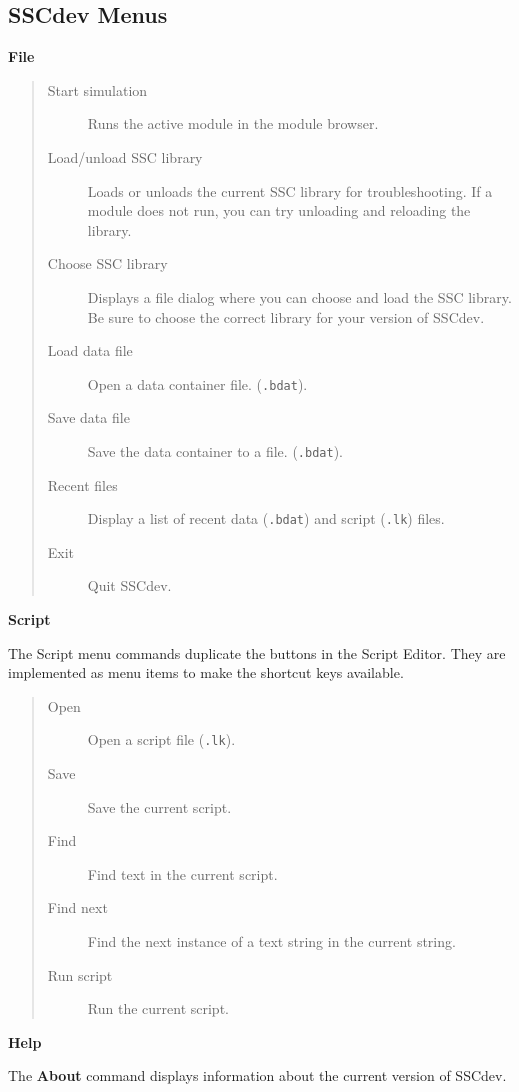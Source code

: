\documentclass{article}
\begin{document}
\subsection{SSCdev Menus}
\label{sec_sscdev_menus}

\textbf{File}
\begin{quote}
\begin{description}
\item[Start simulation] Runs the active module in the module browser.
\item[Load/unload SSC library] Loads or unloads the current SSC library for troubleshooting. If a module does not run, you can try unloading and reloading the library.
\item[Choose SSC library] Displays a file dialog where you can choose and load the SSC library. Be sure to choose the correct library for your version of SSCdev.
\item[Load data file] Open a data container file. (\texttt{.bdat}).
\item[Save data file] Save the data container to a file. (\texttt{.bdat}).
\item[Recent files] Display a list of recent data (\texttt{.bdat}) and script (\texttt{.lk}) files.
\item[Exit] Quit SSCdev.
\end{description}
\end{quote}

\textbf{Script}

The Script menu commands duplicate the buttons in the Script Editor. They are implemented as menu items to make the shortcut keys available.

\begin{quote}
\begin{description}
\item[Open] Open a script file (\texttt{.lk}).
\item[Save] Save the current script.
\item[Find] Find text in the current script.
\item[Find next] Find the next instance of a text string in the current string.
\item[Run script] Run the current script. 
\end{description}
\end{quote}

\textbf{Help}

The \textbf{About} command displays information about the current version of SSCdev.
\end{document}
